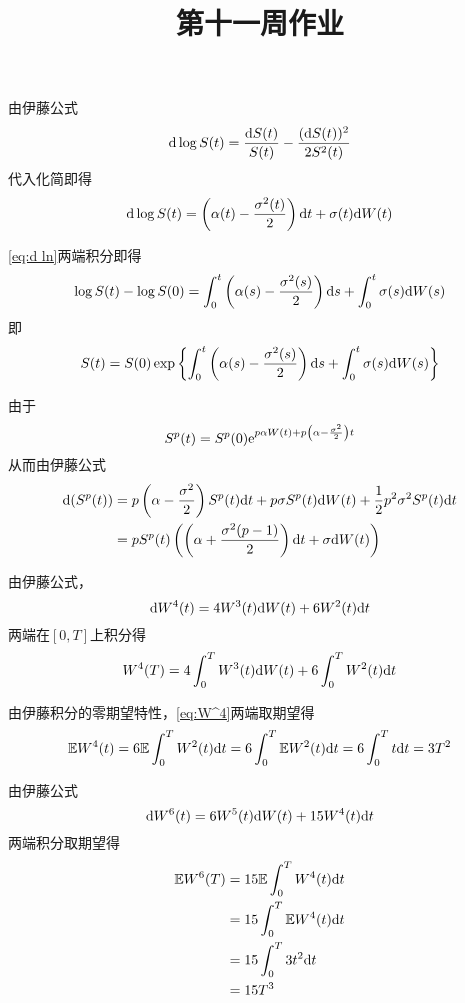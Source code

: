 \documentclass[cn]{homework}
\title{第十一周作业}
\newcommand{\E}{\mathbb{E}}
\begin{document}
    \maketitle
    
    \problem[习题4.5]
    \begin{subproblem}
        \item
        由伊藤公式
        \[\mathrm d\log S(t)=\frac{\mathrm d S(t)}{S(t)}-\frac{(\mathrm d S(t))^2}{2S^2(t)}\]
        代入化简即得
        \begin{equation}
            \label{eq:d ln}
            \mathrm d\log S(t)=\left(\alpha(t)-\frac{\sigma^2(t)}{2}\right)\mathrm d t
            +\sigma(t)\mathrm d W(t)
        \end{equation}

        \item
        \cref{eq:d ln}两端积分即得
        \[\log S(t)-\log S(0)
        =\int_0^t\left(\alpha(s)-\frac{\sigma^2(s)}{2}\right)\mathrm d s
        +\int_0^t\sigma(s)\mathrm d W(s)\]
        即
        \[S(t)=S(0)\exp\left\{
        \int_0^t\left(\alpha(s)-\frac{\sigma^2(s)}{2}\right)\mathrm d s
        +\int_0^t\sigma(s)\mathrm d W(s)
        \right\}\]
    \end{subproblem}

    \problem[习题4.6]
    由于
    \[S^p(t)=S^p(0)\mathrm e^{p\alpha W(t)+p\left(\alpha-\frac{\sigma^2}{2}\right)t}\]
    从而由伊藤公式
    \[\begin{aligned}
        \mathrm d(S^p(t))&=p\left(\alpha-\frac{\sigma^2}{2}\right)S^p(t)\mathrm d t
        +p\sigma S^p(t)\mathrm d W(t)+\frac{1}{2}p^2\sigma^2S^p(t)\mathrm d t\\
        &=pS^p(t)\left(
        \left(\alpha+\frac{\sigma^2(p-1)}{2}\right)\mathrm d t+\sigma\mathrm d W(t)
        \right)
    \end{aligned}\]

    \problem[习题4.7]
    \begin{subproblem}
        \item
        由伊藤公式，
        \[\mathrm d W^4(t)=4W^3(t)\mathrm d W(t)+6W^2(t)\mathrm d t\]
        两端在$[0,T]$上积分得
        \begin{equation}
            \label{eq:W^4}
            W^4(T)=4\int_0^TW^3(t)\mathrm d W(t)+6\int_0^TW^2(t)\mathrm d t
        \end{equation}

        \item
        由伊藤积分的零期望特性，\cref{eq:W^4}两端取期望得
        \[\E W^4(t)=6\E\int_0^TW^2(t)\diff t=6\int_0^T\E W^2(t)\diff t
        =6\int_0^Tt\diff t=3T^2\]

        \item
        由伊藤公式
        \[\mathrm d W^6(t)=6W^5(t)\mathrm d W(t)+15W^4(t)\mathrm d t\]
        两端积分取期望得
        \[\begin{aligned}
            \E W^6(T)&=15\E\int_0^TW^4(t)\diff t\\
            &=15\int_0^T\E W^4(t)\diff t\\
            &=15\int_0^T3t^2\diff t\\
            &=15T^3
        \end{aligned}\]

    \end{subproblem}
\end{document}

